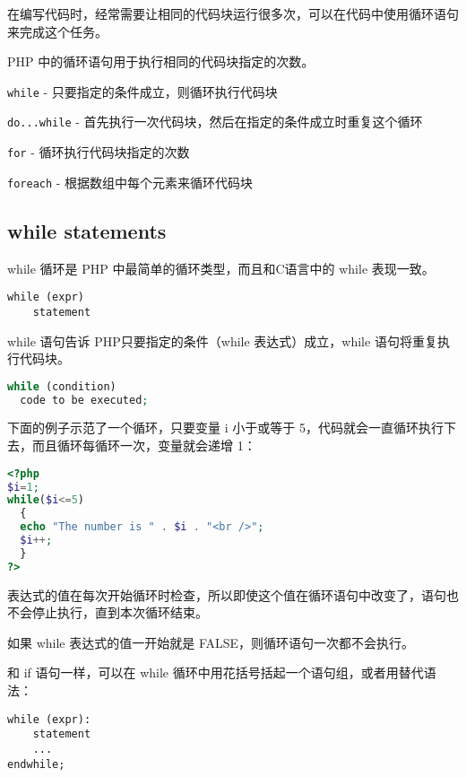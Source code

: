 在编写代码时，经常需要让相同的代码块运行很多次，可以在代码中使用循环语句来完成这个任务。


PHP 中的循环语句用于执行相同的代码块指定的次数。


\begin{compactitem}
\item \texttt{while} - 只要指定的条件成立，则循环执行代码块
\item \texttt{do...while} - 首先执行一次代码块，然后在指定的条件成立时重复这个循环
\item \texttt{for} - 循环执行代码块指定的次数
\item \texttt{foreach} - 根据数组中每个元素来循环代码块
\end{compactitem}



\subsection{while statements}

while 循环是 PHP 中最简单的循环类型，而且和C语言中的 while 表现一致。

\begin{verbatim}
while (expr)
    statement
\end{verbatim}

while 语句告诉 PHP只要指定的条件（while 表达式）成立，while 语句将重复执行代码块。


\begin{lstlisting}[language=PHP]
while (condition)
  code to be executed;
\end{lstlisting}

下面的例子示范了一个循环，只要变量 i 小于或等于 5，代码就会一直循环执行下去，而且循环每循环一次，变量就会递增 1：

\begin{lstlisting}[language=PHP]
<?php 
$i=1;
while($i<=5)
  {
  echo "The number is " . $i . "<br />";
  $i++;
  }
?>
\end{lstlisting}

表达式的值在每次开始循环时检查，所以即使这个值在循环语句中改变了，语句也不会停止执行，直到本次循环结束。

如果 while 表达式的值一开始就是 FALSE，则循环语句一次都不会执行。

和 if 语句一样，可以在 while 循环中用花括号括起一个语句组，或者用替代语法：

\begin{verbatim}
while (expr):
    statement
    ...
endwhile;
\end{verbatim}

